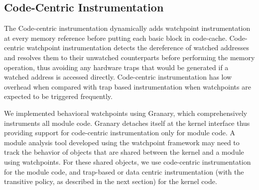 


\subsection{Code-Centric Instrumentation}
The Code-centric instrumentation dynamically adds watchpoint instrumentation at every memory reference before putting each basic block in code-cache. Code-centric watchpoint instrumentation detects the dereference of watched addresses and resolves them to their unwatched counterparts before performing the memory operation, thus avoiding any hardware traps that would be generated if a watched address is accessed directly. Code-centric instrumentation has low overhead when compared with trap based instrumentation when watchpoints are expected to be triggered frequently.

We implemented behavioral watchpoints using Granary, which comprehensively instruments all module code. Granary detaches itself at the kernel interface thus providing support for code-centric instrumentation only for module code. A module analysis tool developed using the watchpoint framework may need to track the behavior of objects that are shared between the kernel and a module using watchpoints. 
For these shared objects, we use code-centric instrumentation for the module code, and trap-based or data centric instrumentation (with the transitive policy, as described in
the next section) for the kernel code.


